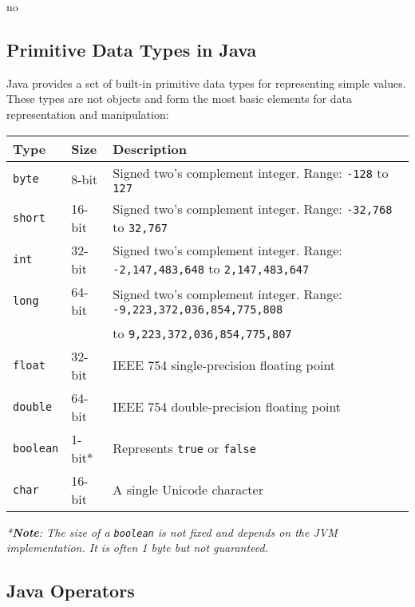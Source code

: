 no\documentclass{article}
\newcommand{\codecmd}[1]{\textcolor[rgb]{0,0.5,0}{\texttt{#1}}}
\begin{document}
\subsection{Primitive Data Types in Java}
Java provides a set of built-in primitive data types for representing simple values. These types are not objects and form the most basic elements for data representation and manipulation:

\begin{table}[h!]
\centering
\begin{tabular}{@{}lll@{}}
\toprule
\textbf{Type} & \textbf{Size} & \textbf{Description} \\
\midrule
\texttt{byte}   & 8-bit   & Signed two’s complement integer. Range: \texttt{-128} to \texttt{127} \\
\texttt{short}  & 16-bit  & Signed two’s complement integer. Range: \texttt{-32,768} to \texttt{32,767} \\
\texttt{int}    & 32-bit  & Signed two’s complement integer. Range: \texttt{-2,147,483,648} to \texttt{2,147,483,647} \\
\texttt{long}   & 64-bit  & Signed two’s complement integer. Range: \texttt{-9,223,372,036,854,775,808} \\
                &         & to \texttt{9,223,372,036,854,775,807} \\
\texttt{float}  & 32-bit  & IEEE 754 single-precision floating point \\
\texttt{double} & 64-bit  & IEEE 754 double-precision floating point \\
\texttt{boolean}& 1-bit*  & Represents \texttt{true} or \texttt{false} \\
\texttt{char}   & 16-bit  & A single Unicode character \\
\bottomrule
\end{tabular}
\end{table}
\textit{*\textbf{Note}: The size of a \codecmd{boolean} is not fixed and depends on the JVM implementation. It is often 1 byte but not guaranteed.}

\subsection{Java Operators}
\end{document}

